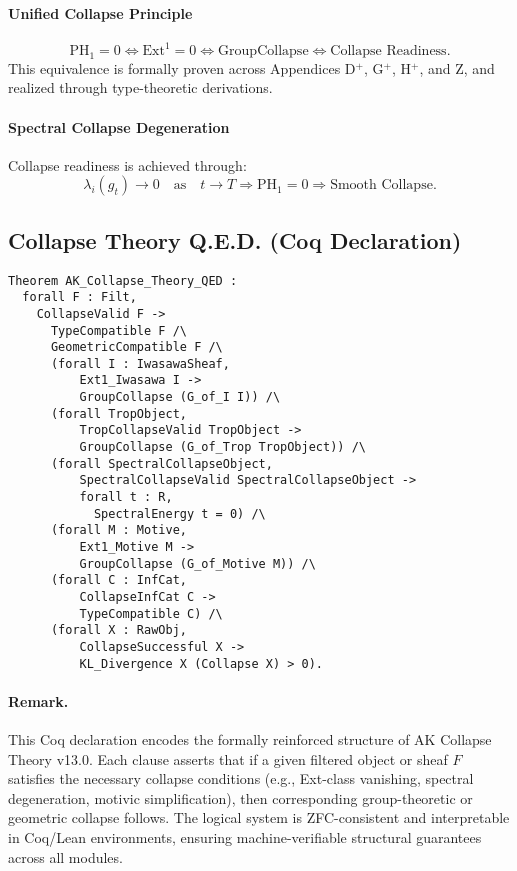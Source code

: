 \documentclass[11pt]{article}
\begin{document}
\paragraph{Unified Collapse Principle}
\[
\mathrm{PH}_1 = 0 \iff \mathrm{Ext}^1 = 0 \iff \mathrm{GroupCollapse} \iff \text{Collapse Readiness}.
\]
This equivalence is formally proven across Appendices D$^{+}$, G$^{+}$, H$^{+}$, and Z, and realized through type-theoretic derivations.

\paragraph{Spectral Collapse Degeneration}
Collapse readiness is achieved through:
\[
\lambda_i(g_t) \longrightarrow 0 \quad \text{as} \quad t \to T \Rightarrow \mathrm{PH}_1 = 0 \Rightarrow \text{Smooth Collapse}.
\]

\subsection*{Collapse Theory Q.E.D. (Coq Declaration)}

\begin{lstlisting}[language=Coq, caption={Formal Q.E.D. Declaration of AK Collapse Theory}]
Theorem AK_Collapse_Theory_QED :
  forall F : Filt,
    CollapseValid F ->
      TypeCompatible F /\
      GeometricCompatible F /\
      (forall I : IwasawaSheaf,
          Ext1_Iwasawa I ->
          GroupCollapse (G_of_I I)) /\
      (forall TropObject,
          TropCollapseValid TropObject ->
          GroupCollapse (G_of_Trop TropObject)) /\
      (forall SpectralCollapseObject,
          SpectralCollapseValid SpectralCollapseObject ->
          forall t : R,
            SpectralEnergy t = 0) /\
      (forall M : Motive,
          Ext1_Motive M ->
          GroupCollapse (G_of_Motive M)) /\
      (forall C : InfCat,
          CollapseInfCat C ->
          TypeCompatible C) /\
      (forall X : RawObj,
          CollapseSuccessful X ->
          KL_Divergence X (Collapse X) > 0).
\end{lstlisting}


\paragraph{Remark.}
This Coq declaration encodes the formally reinforced structure of AK Collapse Theory v13.0.  
Each clause asserts that if a given filtered object or sheaf \( F \) satisfies the necessary collapse conditions (e.g., Ext-class vanishing, spectral degeneration, motivic simplification), then corresponding group-theoretic or geometric collapse follows.  
The logical system is ZFC-consistent and interpretable in Coq/Lean environments, ensuring machine-verifiable structural guarantees across all modules.
\end{document}
